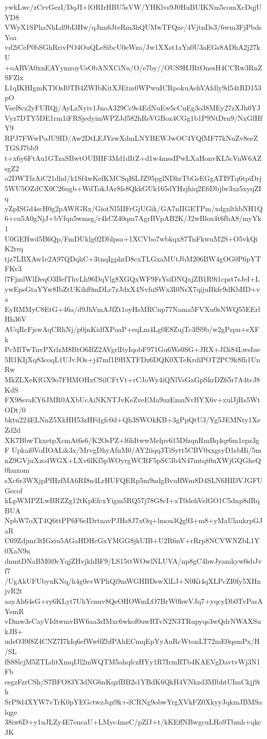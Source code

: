 ywkLwc/zCrvGezI/DqJI+lORIrHBU5sVW/YHKlvs9J0HuBUIKNm5comXcDqjUYD8
VWyX1SPhaNhLd9bI3Hw/qJnn6JteRm3hQUMwTFQze/4VjtnDs3/6wm3FjPbdsYoa
vd2iCeP0bSGhRrivPO4OuQLeSibcU0eWza/Jw1XXst1aYa0U3aEGs8ADhA2j27kU
+oARVA0xnEAYymroyUsObANXCiNu/O/e7by//OUS9HJRtOnesH4CCRw3RnZSFZlx
L1qIKHIgmKTlOsI0TB4ZWIbKitXJEtm0WPwuICRpokuAehVAfdly9d54tRD153pO
Vsef8cz2yFURQj/AyLzNyiv1JnoA329Cc9s4EdNuEw5cCuEg3o38MEy27zXJh0YJ
Vyz7DTY5DE1rm1iFRSjedyimWPZJd582hReVGBox4CGg1b1P9NtDrn9/NxGfHfY9
RPJ7FWwPoJU9ID/Aw2DtLEJYzwXdmLNYBEWJwOC4YQfMF77kNuZv8eeZTGSJ7bb9
t+x6y6FtAu1GTzaSBwtOUBHF3Md1dItZ+d1w4mssIPwLXaHonvKL5cVnW6AZsgZ2
o2DWTfzAiC21dhd/k1Sf4wKefKMCSqI6LJZ95pglNDhrTbGsEGgATI9Tq6tpiDrj
5WU5OZdCX0C26ugb+WdTokJAr8fs8QkkGUk165dYHzjhiq2E6Dbjlw3xz5xyqZIq
yZpISGd4scH0g2pAWfGRx/GiotNl5IIFrGjUGik/GA7nIIGETPm/xdgnlthbNH1Q
6+cu5A0gNjJ+bVfqn5wmsg/r4kCZ40qm7AgrBVpAB2K/J2wBlox4t6fbA8/myYk1
U0GEHwd5B6Qp/FmDUklg02Dblpsa+1XCVbo7wbkqx87TnFkwuM2S+O5vkQiK2rrq
tjz7LBXAw1e2A97QDqhC+3tnqIgphrD8cxTLGxaMUtJbM206BW4gOG0P6pYTFKv3
l7FjmlWlDeqO3BefThvLh96DqVlg8XGQxWF9FsYsiDNQajZB1R9i1cpst7sJeI+L
ywEpsGtaYYw8IbZtUKihf0mDLc7zJdxX4NvfuSWx3I0NsX7qijuBkfc9dKbHD+va
EyRMMyC8EtG+46a/d9JhVmAJfZt1oyHsMRCnp77Nama5FVXu0sNWQ55EErlHh36V
AUqRcFjswAqCRhNj/p0jnKidfXPoaP+eqLm4Lg0E8ZujTc3fS9b/w2gPspu+eXFk
PcMlTwTnvPXrlzM8BtO6BZ2AVgrlItyIqobF971Gu6Ws0SG+JRX+Jf3i84LwsIue
5R1KIjXq83coqL1UJvJOs+j47mf1I9BXTFDz6DQK0XTeKrdiPOT2PC9k8fh1UnRw
MkZLXeKfGX9o7FHMOHxCSilCFtVt+rCJoWy4iQNlVsGaGpSkrDZ65r7A4tcJ8KdS
FX98svaEY6JMR0AXbUcAiNKNTJvKeZveEMa9uzEmuNvBYX6v+xulJjRs5WtODt/0
bktu224ELNnZ5XkHH53zHFdgfc0d+Qh3SWOkKB+3gPpQtU3/Yg5JEMNty1XeZd2d
XK7BbwTkxetpXcmAt6s6/K2OsPZ+l6hItwwMelpv615DfzqnRmBq4qr6m1epz3gF
Upkai0VoIIOALik3x/MrvgDhyAfuM0/AY2iiqq3TiSytt5CBV0xxgsyD1sbHi/5m
nZ9GVjuXzo4WGX+LXv6lKf5pWOyrgWCRF5pSC3b4N47mtqt0uXWjGQGheQ0huxom
sXc6r3WXjpPfHzfMA6RI8n4LrHUFQERp5m9ndgBvuRWm8D4SLN6HIDVJGFUGecof
kLpWMPZLwBRZZg12tKpEfcxYigm5RQ57j78G8cI+xT0dehVelGO1C5dnp8dRqBUA
NpbW7oXT4Q6ttPP6F6eIDrtnavPJHs8J7xOq+lmou3Qg93+m8+yMaUlaukrpGJaR
C69Zdjmr3tIGziu5AGaHDHcGxYMGG8jkUIB+U2R6nV+rRrp8NCVWNZbL1Y0XaN9n
dnmtDNaBM0i9cYqjZHvjkhBF9/LS15ttWOwlNLUVA/np8gC4hwJyamkyw0sbJvf7
/UgAkUFUbyuKNq/h4g0evWPhQi9mWGHBDswXlLJ+N0Ki4qXLPcZI0fy5XHnjvR2t
aayAh64sG+ry6KLyt7UhYcnuv8QeOHOWmLO7BrW0hwVJq7+yqcyDb0TvPasAYemR
vDmw3eCayVIdtwmvBW6aa3rIMxc6wkof0uwRTvN2N3TRupyqs3wQdrNWAXSukJB+
udsO39f8Z4CNZ7I7kIq6efWw0ZbfPAhECmqEpYyAuRcWtonLT72mE0qsmPx/H/SL
fS88lcjM5ZTLditXmqIJl2mWQTM5ahqfczHYy1R7IrmRTb4KAEVgDavtvWj3N1Fb
esgzFzrCSh/S7BFO83Y3dNG6nKqzfBB2s1YBdK6QkH4VNkzd3MlbhtUImCkjj9ih
SrP9d4XYW7vTrK0pYEGctwzJqz9k+dCRNg9obwYrgXVkFZ0XkyyJqkmJBMSalqge
38iw6D+y1uJLZy4E7encaU+LMyc4meC/pZfJ+t/kKEffNBwgcuLHo9Tbmh+qkcJK
